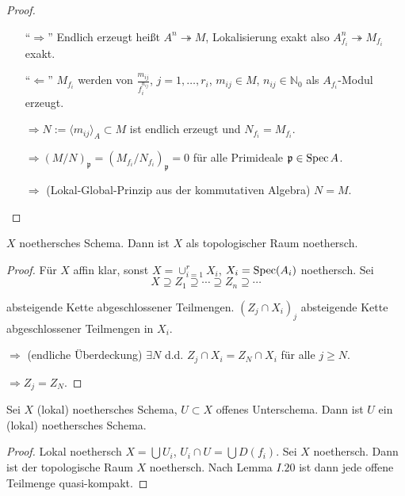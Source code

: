 \begin{proof}
  \mbox{}
  \begin{itemize}
  \item[``$\Rightarrow$'' ] Endlich erzeugt heißt $A^{n}\twoheadrightarrow M$, Lokalisierung
    exakt also $A_{f_{i}}^{n}\twoheadrightarrow M_{f_{i}}$ exakt.
  \item[``$\Leftarrow$''] $M_{f_{i}}$ werden von $\frac{m_{ij}}{f_{i}^{n_{ij}}}$, $j=1,\ldots,r_{i}$,
    $m_{ij}\in M$, $n_{ij}\in\mathbb{N}_{0}$ als $A_{f_{i}}$-Modul
    erzeugt.

    $\Rightarrow N:=\langle m_{ij}\rangle_{A}\subset M$ ist endlich erzeugt
    und $N_{f_{i}}=M_{f_{i}}$.

    $\Rightarrow(M/N)_{\mathfrak{p}}=(M_{f_{i}}/N_{f_{i}})_{\mathfrak{p}}=0$
    für alle Primideale $\mathfrak{p}\in\operatorname{Spec} A$.

    $\Rightarrow$ (Lokal-Global-Prinzip aus der kommutativen Algebra)
    $N=M$.

  \end{itemize}
\end{proof}
\begin{rem*}
  $X$ noethersches Schema. Dann ist $X$ als topologischer Raum noethersch.
\end{rem*}
\begin{proof}
  Für $X$ affin klar, sonst $X=\cup_{i=1}^{r}X_{i}$, $X_{i}=\operatorname{Spec}(A_{i})$
  noethersch. Sei
  \[
    X\supseteq Z_{1}\supseteq\cdots\supseteq Z_{n}\supseteq\cdots
  \]

  absteigende Kette abgeschlossener Teilmengen. $(Z_{j}\cap X_{i})_{j}$
  absteigende Kette abgeschlossener Teilmengen in $X_{i}$.

  $\Longrightarrow$ (endliche Überdeckung) $\exists N$ d.d. $Z_{j}\cap X_{i}=Z_{N}\cap X_{i}$
  für alle $j\geq N$.

  $\Longrightarrow Z_{j}=Z_{N}$.
\end{proof}
\begin{cor}[17]
  Sei $X$ (lokal) noethersches Schema, $U\subset X$ offenes Unterschema.
  Dann ist $U$ ein (lokal) noethersches Schema.
\end{cor}

\begin{proof}
  Lokal noethersch $X=\bigcup U_{i}$, $U_{i}\cap U=\bigcup D(f_{i})$.
  Sei $X$ noethersch. Dann ist der topologische Raum $X$ noethersch.
  Nach Lemma $I.20$ ist dann jede offene Teilmenge quasi-kompakt.
\end{proof}
